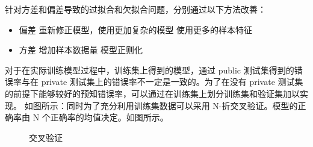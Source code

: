 针对方差和偏差导致的过拟合和欠拟合问题，分别通过以下方法改善：
\begin{itemize}
\item 偏差
	\subitem 重新修正模型，使用更加复杂的模型
	\subitem 使用更多的样本特征
\item 方差
	\subitem 增加样本数据量
	\subitem 模型正则化
\end{itemize}

对于在实际训练模型过程中，训练集上得到的模型，通过 public 测试集得到的错误率与在 private 测试集上的错误率不一定是一致的。为了在没有 private 测试集的前提下能够较好的预知错误率，可以通过在训练集上划分训练集和验证集加以实现。
如图所示：同时为了充分利用训练集数据可以采用 N-折交叉验证。模型的正确率由 N 个正确率的均值决定。如图所示。
\begin{figure}
	\centering

	{\qquad
	}
	\caption{交叉验证}
	\label{fig:cross_validation}
\end{figure}
